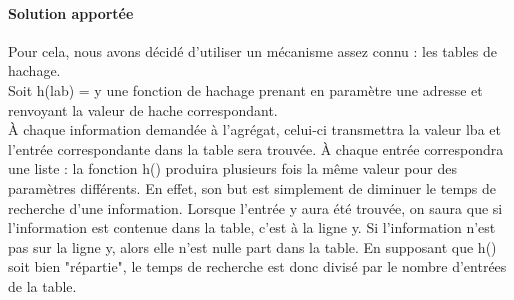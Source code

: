 \documentclass[a4paper,10pt]{article}
\begin{document}
\paragraph{Solution apportée}
Pour cela, nous avons décidé d'utiliser un mécanisme assez connu : les tables de hachage.\\
Soit h(lab) = y une fonction de hachage prenant en paramètre une adresse et renvoyant la valeur de hache correspondant.\\
À chaque information demandée à l'agrégat, celui-ci transmettra la valeur lba et l'entrée correspondante dans la table sera trouvée. À chaque entrée 
correspondra une liste : la fonction h() produira plusieurs fois la même valeur pour des paramètres différents. En effet, son but est simplement de diminuer 
le temps de recherche d'une information. Lorsque l'entrée y aura été trouvée, on saura que si l'information est contenue dans la table, c'est à la ligne y. 
Si l'information n'est pas sur la ligne y, alors elle n'est nulle part dans la table. En supposant que h() soit bien "répartie", le temps de recherche est donc 
divisé par le nombre d'entrées de la table.
\end{document}
